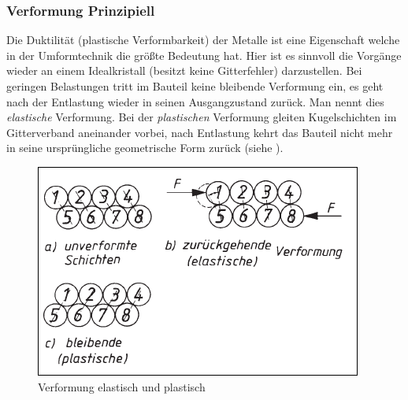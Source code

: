 \documentclass[12pt,a4paper,parskip,twoside,BCOR5mm,headsepline]{scrartcl}
\begin{document}
\begin{description*}
{\subsubsection{Verformung Prinzipiell}
Die Duktilität (plastische Verformbarkeit) der Metalle ist eine Eigenschaft welche in der Umformtechnik die größte Bedeutung hat. Hier ist es sinnvoll die Vorgänge wieder an einem Idealkristall (besitzt keine Gitterfehler) darzustellen. Bei geringen Belastungen tritt im Bauteil keine bleibende Verformung ein, es geht nach  der Entlastung wieder in seinen Ausgangzustand zurück. Man nennt dies \emph{elastische} Verformung. Bei der \emph{plastischen} Verformung gleiten Kugelschichten im Gitterverband aneinander vorbei,  nach Entlastung kehrt das Bauteil nicht mehr in seine ursprüngliche geometrische Form zurück (siehe ).
\begin{figure}
\centering
\includegraphics[width=.8\textwidth]{eloplastkristall}
\caption[Verformung elastisch und plastisch]{Verformung elastisch und plastisch\autocite[45]{wk}}
\label{fig:eloplastkristall} 
\end{figure}

}
\end{description*}
\end{document}
